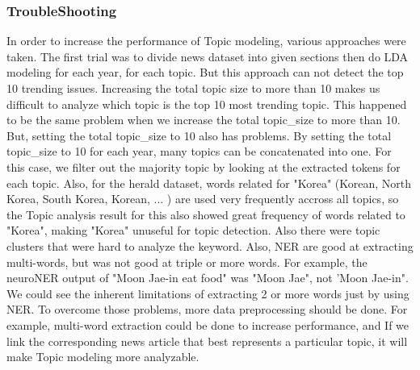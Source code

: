 \subsubsection{TroubleShooting}
In order to increase the performance of Topic modeling, various approaches were taken. The first trial was to divide news dataset into given sections then do LDA modeling for each year, for each topic. But this approach can not detect the top 10 trending issues. Increasing the total topic size to more than 10 makes us difficult to analyze which topic is the top 10 most trending topic. This happened to be the same problem when we increase the total topic\_size to more than 10.
But, setting the total topic\_size to 10 also has problems. By setting the total topic\_size to 10 for each year, many topics can be concatenated into one. For this case, we filter out the majority topic by looking at the extracted tokens for each topic. Also, for the herald dataset, words related for "Korea" (Korean, North Korea, South Korea, Korean, ... ) are used very frequently accross all topics, so the Topic analysis result for this also showed great frequency of words related to "Korea", making "Korea" unuseful for topic detection. Also there were topic clusters that were hard to analyze the keyword. Also, NER are good at extracting multi-words, but was not good at triple or more words. For example, the neuroNER output of "Moon Jae-in eat food" was "Moon Jae", not 'Moon Jae-in". We could see the inherent limitations of extracting 2 or more words just by using NER. To overcome those problems, more data preprocessing should be done. For example, multi-word extraction could be done to increase performance, and If we link the corresponding news article that best represents a particular topic, it will make Topic modeling more analyzable.


